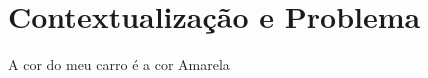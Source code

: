 \section{Contextualização e Problema}
    \label{subsec:contextualizacao-problema}
    
    A cor do meu carro é a cor Amarela
